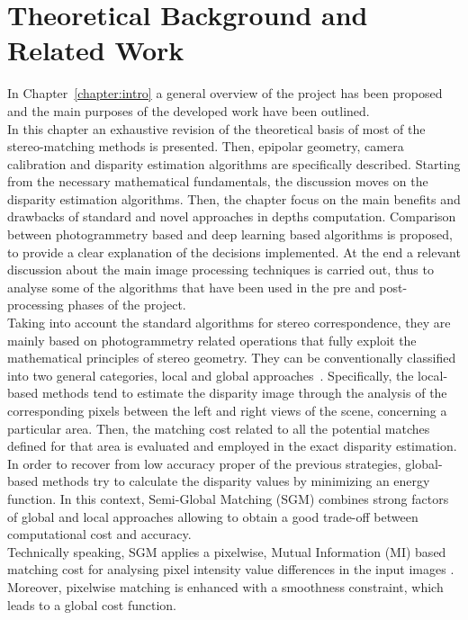 \chapter{Theoretical Background and Related Work}
\label{chapter:background} 

In Chapter~\ref{chapter:intro} a general overview of the project has been proposed and the main purposes of the developed work have been outlined.\\
In this chapter an exhaustive revision of the theoretical basis of most of the stereo-matching methods is presented. 
Then, epipolar geometry, camera calibration and disparity estimation algorithms are specifically described. 
Starting from the necessary mathematical fundamentals, the discussion moves on the disparity estimation algorithms. 
Then, the chapter focus on the main benefits and drawbacks of standard and novel approaches in depths computation.
Comparison between photogrammetry based and deep learning based algorithms is proposed, to provide a clear explanation of the decisions implemented.
At the end a relevant discussion about the main image processing techniques is carried out, thus to analyse some of the algorithms that have been used in the pre and post-processing phases of the project. \\
Taking into account the standard algorithms for stereo correspondence, they are mainly based on photogrammetry related operations that fully exploit the mathematical principles of stereo geometry.
They can be conventionally classified into two general categories, local and global approaches~\cite{Scharstein2001}.
Specifically, the local-based methods tend to estimate the disparity image through the analysis of the corresponding pixels between the left and right views of the scene, concerning a particular area. 
Then, the matching cost related to all the potential matches defined for that area is evaluated and employed in the exact disparity estimation.
In order to recover from low accuracy proper of the previous strategies, global-based methods try to calculate the disparity values by minimizing an energy function.
In this context, Semi-Global Matching (SGM) combines strong factors of global and local approaches allowing to obtain a good trade-off between computational cost and accuracy. \\
Technically speaking, SGM applies a pixelwise, Mutual Information (MI) based matching cost for analysing pixel intensity value differences in the input images \cite{Hirschmuller2008}.
Moreover, pixelwise matching is enhanced with a smoothness constraint, which leads to a global cost function. 
